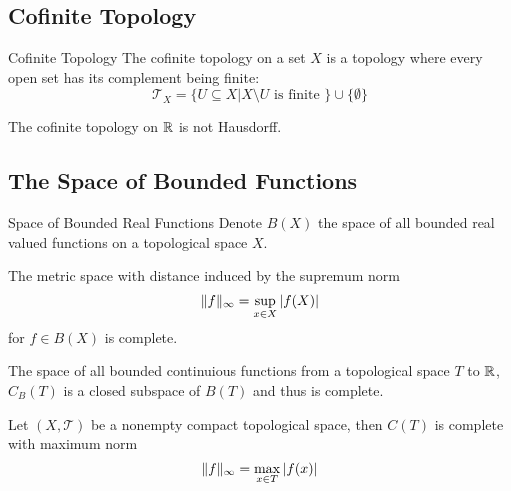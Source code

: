 \documentclass[a4paper]{article}
\begin{document}
\subsection{Cofinite Topology}
\begin{defn}{Cofinite Topology}{} The cofinite topology on a set $X$ is a topology where every open set has its complement being finite: $$\mathcal{T}_X=\{U\subseteq X|X\setminus U\text{ is finite }\}\cup\{\emptyset\}$$
\end{defn}

\begin{prp}{}{} The cofinite topology on $\mathbb{R}$ is not Hausdorff. 
\end{prp}

\subsection{The Space of Bounded Functions}
\begin{defn}{Space of Bounded Real Functions}{} Denote $B(X)$ the space of all bounded real valued functions on a topological space $X$. 
\end{defn}

\begin{prp}{}{} The metric space with distance induced by the supremum norm $$\|f\|_{\infty}=\sup_{x\in X}\abs{f(X)}$$ for $f\in B(X)$ is complete. 
\end{prp}

\begin{prp}{}{} The space of all bounded continuious functions from a topological space $T$ to $\mathbb{R}$, $C_B(T)$ is a closed subspace of $B(T)$ and thus is complete. 
\end{prp}

\begin{crl}{}{} Let $(X,\mathcal{T})$ be a nonempty compact topological space, then $C(T)$ is complete with maximum norm $$\|f\|_\infty=\max_{x\in T}\abs{f(x)}$$
\end{crl}
\end{document}
